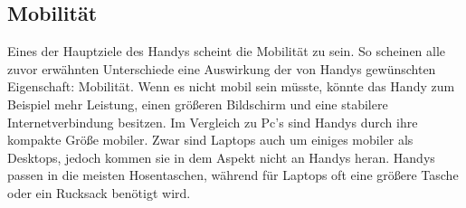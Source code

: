\subsection{Mobilität}\myCheckmark
Eines der Hauptziele des Handys scheint die Mobilität zu sein. %
	So scheinen alle zuvor erwähnten Unterschiede eine Auswirkung der von Handys gewünschten Eigenschaft: Mobilität. %
		Wenn es nicht mobil sein müsste, könnte das Handy zum Beispiel mehr Leistung, einen größeren Bildschirm und eine stabilere Internetverbindung besitzen.\newline%
Im Vergleich zu Pc's sind Handys durch ihre kompakte Größe mobiler. Zwar sind Laptops auch um einiges mobiler als Desktops, jedoch kommen sie in dem Aspekt nicht an Handys heran. Handys passen in die meisten Hosentaschen, während für Laptops oft eine größere Tasche oder ein Rucksack benötigt wird.%







